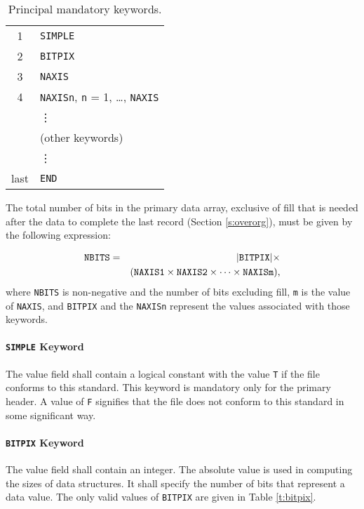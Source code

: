 \begin{table}[htpb]
 \begin{center}
   \begin{tabular}{cl}
       1      & {\tt SIMPLE} \\
       2      & {\tt BITPIX} \\
       3      & {\tt NAXIS} \\
       4      & {\tt NAXISn}, {\tt n} = 1, \ldots, {\tt NAXIS} \\
              & \vdots \\
              & (other keywords) \\
              & \vdots \\
       last   & {\tt END} \\
   \end{tabular}
 \end{center}
 \caption{Principal mandatory keywords.}
 \label{t:hdr1}
\end{table}

 The total number of bits in the primary data array, 
 exclusive of fill that is needed after the data to complete the last record 
 (Section \ref{s:overorg}), must be given by the
 following expression:

\begin{eqnarray}  
   \mbox{{\tt NBITS}} &=&  
                     |\mbox{{\tt BITPIX}}|  \times \nonumber \\
                 & & (\mbox{{\tt NAXIS1}} \times 
                 \mbox{{\tt NAXIS2}} \times  \cdots \times \mbox{{\tt
NAXISm}}),
\end{eqnarray}
 \noindent
 where {\tt NBITS} is
 non-negative and the number of bits excluding fill, 
 {\tt m} is the value of {\tt NAXIS}, and
 {\tt BITPIX} and the {\tt NAXISn} represent 
 the values associated with those keywords.          
  
   \paragraph{{\tt SIMPLE} Keyword}
 The value field shall contain a logical constant with the
 value {\tt T} if the file conforms to this standard. 
 This keyword is mandatory only for the primary
 header.  A value of {\tt F} signifies that the file does not 
 conform to this standard in some 
 significant way.
  
   \paragraph{{\tt BITPIX} Keyword}
 The value field shall contain an integer.  The
 absolute value is used 
 in computing the sizes of data structures.  It shall specify
 the number of bits that represent a data value. The only valid values 
 of {\tt BITPIX} are given in Table \ref{t:bitpix}.

